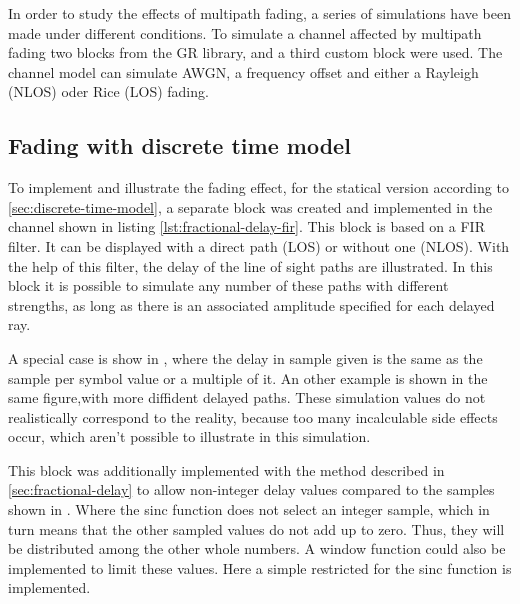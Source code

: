 In order to study the effects of multipath fading, a series of simulations have been made under different conditions. To simulate a channel affected by multipath fading two blocks from the GR library, and a third custom block were used. The channel model can simulate AWGN, a frequency offset and either a Rayleigh (NLOS) oder Rice (LOS) fading.

\subsection{Fading with discrete time model} \label{sec:discrete-time-model-fir}

 To implement and illustrate the fading effect, for the statical version according to \ref{sec:discrete-time-model}, a separate block was created and implemented in the channel shown in listing \ref{lst:fractional-delay-fir}. This block is based on a FIR filter. It can be displayed with a direct path (LOS) or without one (NLOS).
With the help of this filter, the delay of the line of sight paths are illustrated. In this block it is possible to simulate any number of these paths with different strengths, as long as there is an associated amplitude specified for each delayed ray. 

A special case is show in , where the delay in sample given is the same as the sample per symbol value or a multiple of it. An other example is shown in the same figure,with more diffident delayed paths. These simulation values do not realistically correspond to the reality, because too many incalculable side effects occur, which aren't possible to illustrate in this simulation.

This block was additionally implemented with the method described in \ref{sec:fractional-delay} to allow non-integer delay values compared to the samples shown in . Where the sinc function does not select an integer sample, which in turn means that the other sampled values do not add up to zero.
Thus, they will be distributed among the other whole numbers. A window function could also be implemented to limit these values. Here  a simple restricted for the sinc function is implemented.

